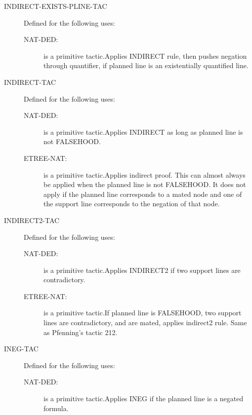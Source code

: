 \begin{description}
\begin{description}
\end{description}

\item[INDIRECT-EXISTS-PLINE-TAC]  Defined for the following uses:
\begin{description}
\item[NAT-DED:]  is a primitive tactic.Applies INDIRECT rule, then pushes negation through quantifier, 
if planned line is an existentially quantified line.

\end{description}

\item[INDIRECT-TAC]  Defined for the following uses:
\begin{description}
\item[NAT-DED:]  is a primitive tactic.Applies INDIRECT as long as planned line is not FALSEHOOD.

\item[ETREE-NAT:]  is a primitive tactic.Applies indirect proof.  This can almost always be applied when the
planned line is not FALSEHOOD.  It does not apply if the planned line
corresponds to a mated node and one of the support line corresponds
to the negation of that node.

\end{description}

\item[INDIRECT2-TAC]  Defined for the following uses:
\begin{description}
\item[NAT-DED:]  is a primitive tactic.Applies INDIRECT2 if two support lines are contradictory.

\item[ETREE-NAT:]  is a primitive tactic.If planned line is FALSEHOOD, two support lines are contradictory, 
and are mated, applies indirect2 rule.  Same as Pfenning's tactic 212.

\end{description}

\item[INEG-TAC]  Defined for the following uses:
\begin{description}
\item[NAT-DED:]  is a primitive tactic.Applies INEG if the planned line is a negated formula.


\end{description}
\end{description}
